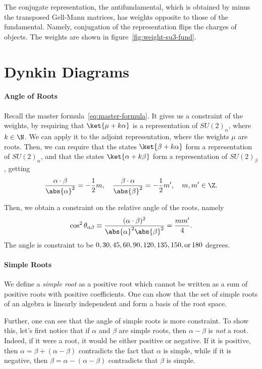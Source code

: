 The conjugate representation, the antifundamental, which is obtained by minus the transposed Gell-Mann matrices, has weights opposite to those of the fundamental. Namely, conjugation of the representation flips the charges of objects. The weights are shown in figure~\ref{fig:weight-su3-fund}.

\section{Dynkin Diagrams}
\paragraph{Angle of Roots}
Recall the master formula~\eqref{eq:master-formula}. It gives us a constraint of the weights, by requiring that $\ket{\mu + k\alpha}$ is a representation of $SU(2)_\alpha$, where $k \in \N$. We can apply it to the adjoint representation, where the weights $\mu$ are roots. Then, we can require that the states $\ket{\beta + k \alpha}$ form a representation of $SU(2)_\alpha$, and that the states $\ket{\alpha + k \beta}$ form a representation of $SU(2)_\beta$, getting
\begin{equation}
    \frac{\alpha \cdot \beta}{\abs{\alpha}^2} = - \frac{1}{2} m , \quad \frac{\beta \cdot \alpha}{\abs{\beta}^2} = - \frac{1}{2} m', \quad m, m' \in \Z.
\end{equation}

Then, we obtain a constraint on the relative angle of the roots, namely
\begin{equation}
    \cos^2 \theta_{\alpha\beta} \equiv \frac{(\alpha\cdot\beta)^2}{\abs{\alpha}^2\abs{\beta}^2} = \frac{mm'}{4}.
\end{equation}
The angle is constraint to be $0,30,45,60,90,120,135,150,\textup{or} \, 180$ degrees.

\paragraph{Simple Roots}
We define a \emph{simple root} as a positive root which cannot be written as a sum of positive roots with positive coefficients. One can show that the set of simple roots of an algebra is linearly independent and form a basis of the root space.

Further, one can see that the angle of simple roots is more constraint. To show this, let's first notice that if $\alpha$ and $\beta$ are simple roots, then $\alpha - \beta$ is \emph{not} a root. Indeed, if it were a root, it would be either positive or negative. If it is positive, then $\alpha = \beta + (\alpha - \beta)$ contradicts the fact that $\alpha$ is simple, while if it is negative, then $\beta = \alpha - (\alpha - \beta)$ contradicts that $\beta$ is simple.

